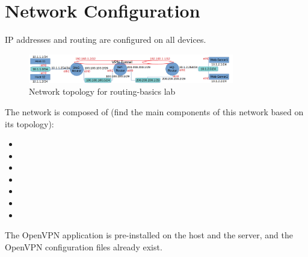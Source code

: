 \section{Network Configuration}
IP addresses and routing are configured on all devices.

\begin{figure}[H]
\begin{center}
\includegraphics [width=0.8\textwidth]{labtainers-vpn3-lab-01.png}
\end{center}
\caption{Network topology for routing-basics lab}
\label{fig:topology}
\end{figure}

The network is composed of (find the main components of this network based on its topology):
\begin{itemize}
	\item
	\item
	\item
	\item
	\item
	\item
	\item
\end{itemize}

The OpenVPN application is pre-installed on the host and the server, and the OpenVPN configuration files already exist.

